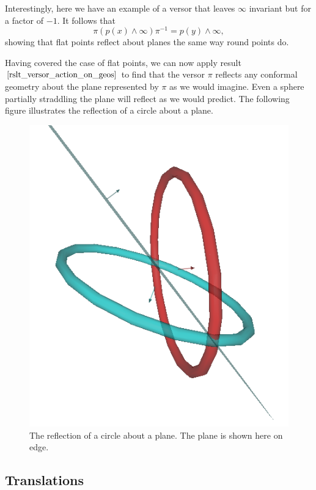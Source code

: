 \documentclass[12pt]{article}
\newcommand{\nvai}{\infty}
\begin{document}
Interestingly, here we have an example of a versor that leaves $\nvai$
invariant but for a factor of $-1$.  It follows that
\begin{equation*}
\pi(p(x)\wedge\nvai)\pi^{-1} = p(y)\wedge\nvai,
\end{equation*}
showing that flat points reflect about planes the same way round points do.

Having covered the case of flat points, we can now apply result $\eqref{rslt_versor_action_on_geos}$
to find that the versor $\pi$ reflects any conformal geometry about the plane represented by
$\pi$ as we would imagine.  Even a sphere partially straddling the plane will reflect as we would predict.
The following figure illustrates the reflection of a circle about a plane.
\begin{figure}[H]
\centering
\includegraphics[scale=0.3]{ReflectionOfCircleAboutPlaneFigure}
\caption{The reflection of a circle about a plane.  The plane is shown here on edge.}
\end{figure}

\subsection{Translations}
\end{document}
